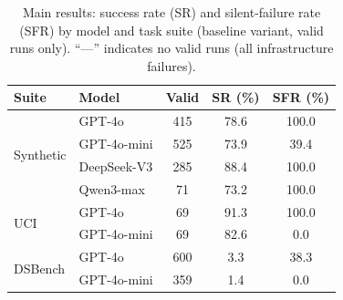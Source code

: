 \begin{table}[t]
\centering
\caption{Main results: success rate (SR) and silent-failure rate (SFR) by model and task suite (baseline variant, valid runs only). ``---'' indicates no valid runs (all infrastructure failures).}
\label{tab:main-results}
\small
\begin{tabular}{@{}llccc@{}}
\toprule
Suite & Model & Valid & SR (\%) & SFR (\%) \\
\midrule
\multirow{4}{*}{Synthetic} & GPT-4o & 415 & 78.6 & 100.0 \\
 & GPT-4o-mini & 525 & 73.9 & 39.4 \\
 & DeepSeek-V3 & 285 & 88.4 & 100.0 \\
 & Qwen3-max & 71 & 73.2 & 100.0 \\
\midrule
\multirow{2}{*}{UCI} & GPT-4o & 69 & 91.3 & 100.0 \\
 & GPT-4o-mini & 69 & 82.6 & 0.0 \\
\midrule
\multirow{2}{*}{DSBench} & GPT-4o & 600 & 3.3 & 38.3 \\
 & GPT-4o-mini & 359 & 1.4 & 0.0 \\
\bottomrule
\end{tabular}
\end{table}
